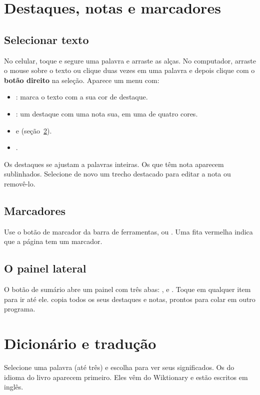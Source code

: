 \documentclass[11pt]{article}
\begin{document}
\section{Destaques, notas e marcadores}

\subsection{Selecionar texto}
No celular, toque e segure uma palavra e arraste as alças. No computador, arraste o mouse sobre o
texto ou clique duas vezes em uma palavra e depois clique com o \textbf{botão direito} na seleção.
Aparece um menu com:
\begin{itemize}
  \item {}: marca o texto com a sua cor de destaque.
  \item {}: um destaque com uma nota sua, em uma de quatro cores.
  \item {} e  (seção~\ref{sec:lookup}).
  \item {}.
\end{itemize}
Os destaques se ajustam a palavras inteiras. Os que têm nota aparecem sublinhados. Selecione de
novo um trecho destacado para editar a nota ou removê-lo.

\subsection{Marcadores}
Use o botão de marcador da barra de ferramentas, ou . Uma fita vermelha indica que a
página tem um marcador.

\subsection{O painel lateral}
O botão de sumário abre um painel com três abas: ,  e .
Toque em qualquer item para ir até ele.  copia todos os seus destaques
e notas, prontos para colar em outro programa.

\section{Dicionário e tradução}\label{sec:lookup}

Selecione uma palavra (até três) e escolha  para ver seus significados. Os do idioma
do livro aparecem primeiro. Eles vêm do Wiktionary e estão escritos em inglês.
\end{document}
